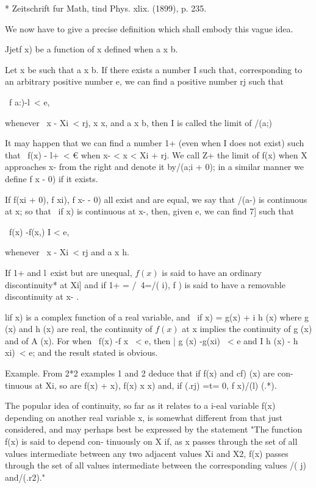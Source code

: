 * Zeitschrift fur Math, tind Phys. xlix. (1899), p. 235.

%
%

We now have to give a precise definition which shall embody this vague
idea.

Jjetf x) be a function of x defined when a x b.

Let x be such that a x b. If there exists a number I such that,
corresponding to an arbitrary positive number e, we can find a
positive number rj such that

\ f a:)-l\ < e,

whenever \ x - Xi\ < rj, x x, and a x b, then I is called the limit
of /(a;)

It may happen that we can find a number 1+ (even when I does not
exist) such that \ f(x) - l+\ < € when x- < x < Xi + rj. We call Z+
the limit of f(x) when X approaches x- from the right and denote it
by/(a;i + 0); in a similar manner we define f x - 0) if it exists.

If f(xi + 0), f xi), f x- - 0) all exist and are equal, we say that
/(a-) is continuous at x; so that \ if x) is continuous at x-, then,
given e, we can find 7] such that

\ f(x) -f(x,) I < e,

whenever \ x - Xi\ < rj and a x h.

If 1+ and l\ exist but are unequal, $f(x)$ is said to have an ordinary
discontinuity* at Xi] and if 1+ = /\ 4=/( i), f ) is said to have a
removable discontinuity at x- .

lif x) is a complex function of a real variable, and \ if x) = g(x) +
i h (x) where g (x) and h (x) are real, the continuity of $f(x)$ at x
implies the continuity of g (x) and of A (x). For when \ f(x) -f x \
< e, then | g (x) -g(xi) \ < e and I h (x) - h xi)\ < e; and the
result stated is obvious.

Example. From 2*2 examples 1 and 2 deduce that if f(x) and cf) (x) are
con- tinuous at Xi, so are f(x) + x), f(x) x x) and, if (.rj) =t= 0,
f x)/(l) (.*).

The popular idea of continuity, so far as it relates to a i-eal
variable f(x) depending on another real variable x, is somewhat
different from that just considered, and may perhaps best be expressed
by the statement "The function f(x) is said to depend con- tinuously
on X if, as x passes through the set of all values intermediate
between any two adjacent values Xi and X2, f(x) passes through the set
of all values intermediate between the corresponding values /( j)
and/(.r2)."

